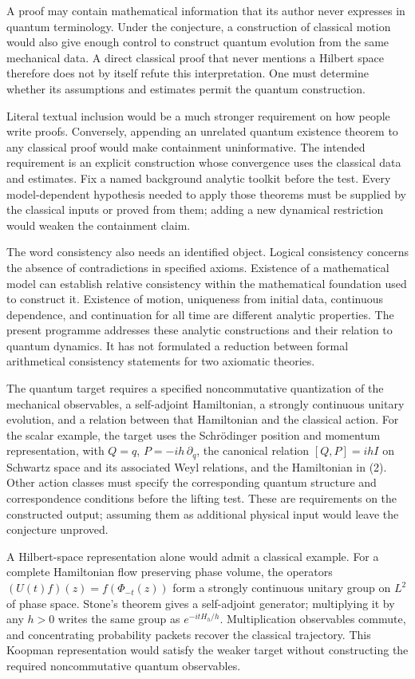 \documentclass[11pt,a4paper]{article}
\begin{document}
A proof may contain mathematical information that its author never
expresses in quantum terminology. Under the conjecture, a construction
of classical motion would also give enough control to construct quantum
evolution from the same mechanical data. A direct classical proof that
never mentions a Hilbert space therefore does not by itself refute this
interpretation. One must determine whether its assumptions and estimates
permit the quantum construction.

Literal textual inclusion would be a much stronger requirement on how
people write proofs. Conversely, appending an unrelated quantum
existence theorem to any classical proof would make containment
uninformative. The intended requirement is an explicit construction
whose convergence uses the classical data and estimates. Fix a named
background analytic toolkit before the test. Every model-dependent
hypothesis needed to apply those theorems must be supplied by the
classical inputs or proved from them; adding a new dynamical restriction
would weaken the containment claim.

The word consistency also needs an identified object. Logical
consistency concerns the absence of contradictions in specified axioms.
Existence of a mathematical model can establish relative consistency
within the mathematical foundation used to construct it. Existence of
motion, uniqueness from initial data, continuous dependence, and
continuation for all time are different analytic properties. The present
programme addresses these analytic constructions and their relation to
quantum dynamics. It has not formulated a reduction between formal
arithmetical consistency statements for two axiomatic theories.

The quantum target requires a specified noncommutative quantization of
the mechanical observables, a self-adjoint Hamiltonian, a strongly
continuous unitary evolution, and a relation between that Hamiltonian
and the classical action. For the scalar example, the target uses the
Schrödinger position and momentum representation, with \(Q=q\),
\(P=-ih\,\partial_q\), the canonical relation \([Q,P]=ihI\) on Schwartz
space and its associated Weyl relations, and the Hamiltonian in (2).
Other action classes must specify the corresponding quantum structure
and correspondence conditions before the lifting test. These are
requirements on the constructed output; assuming them as additional
physical input would leave the conjecture unproved.

A Hilbert-space representation alone would admit a classical example.
For a complete Hamiltonian flow preserving phase volume, the operators
\((U(t)f)(z)=f(\Phi_{-t}(z))\) form a strongly continuous unitary group
on \(L^2\) of phase space. Stone's theorem gives a self-adjoint
generator; multiplying it by any \(h>0\) writes the same group as
\(e^{-itH_h/h}\). Multiplication observables commute, and concentrating
probability packets recover the classical trajectory. This Koopman
representation would satisfy the weaker target without constructing the
required noncommutative quantum observables.
\end{document}
